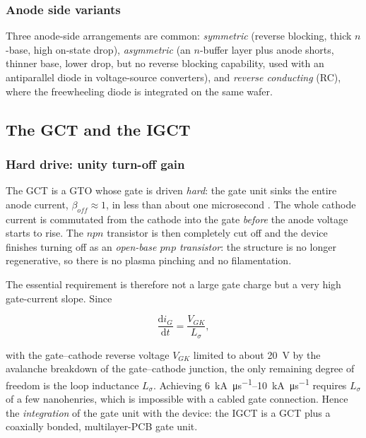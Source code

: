\subsubsection{Anode side variants}

Three anode-side arrangements are common: \emph{symmetric} (reverse blocking,
thick $n$-base, high on-state drop), \emph{asymmetric} (an $n$-buffer layer plus
anode shorts, thinner base, lower drop, but no reverse blocking capability, used
with an antiparallel diode in voltage-source converters), and \emph{reverse
conducting} (RC), where the freewheeling diode is integrated on the same wafer.

\subsection{The GCT and the IGCT}

\subsubsection{Hard drive: unity turn-off gain}

The GCT is a GTO whose gate is driven \emph{hard}: the gate unit sinks the entire
anode current, $\beta_{off} \approx 1$, in less than about one microsecond
\cite{gruening1996harddrive,klaka1997igct}. The whole cathode current is
commutated from the cathode into the gate \emph{before} the anode voltage starts
to rise. The $npn$ transistor is then completely cut off and the device
finishes turning off as an \emph{open-base $pnp$ transistor}: the structure is no
longer regenerative, so there is no plasma pinching and no filamentation.

The essential requirement is therefore not a large gate charge but a very high
gate-current slope. Since

\begin{equation}
\frac{\mathrm{d}i_{G}}{\mathrm{d}t} = \frac{V_{GK}}{L_{\sigma}},
\label{gtoigct:eq:didt}
\end{equation}

with the gate--cathode reverse voltage $V_{GK}$ limited to about
\SI{20}{\volt} by the avalanche breakdown of the gate--cathode junction, the
only remaining degree of freedom is the loop inductance $L_{\sigma}$. Achieving
\SIrange{6}{10}{\kilo\ampere\per\micro\second} requires $L_{\sigma}$ of a few
nanohenries, which is impossible with a cabled gate connection. Hence the
\emph{integration} of the gate unit with the device: the IGCT is a GCT plus a
coaxially bonded, multilayer-PCB gate unit.

